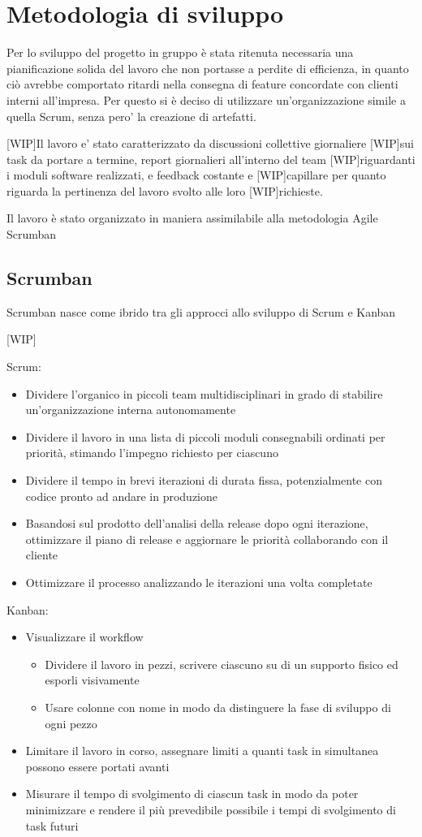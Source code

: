 \chapter{Metodologia di sviluppo}
\label{ch:metodologia}
Per lo sviluppo del progetto in gruppo è stata ritenuta necessaria una pianificazione solida del lavoro che non portasse a perdite di efficienza, in quanto ciò avrebbe comportato ritardi nella consegna di feature concordate con clienti interni all'impresa.
Per questo si è deciso di utilizzare un'organizzazione simile a quella Scrum, senza pero' la creazione di artefatti.

[WIP]Il lavoro e' stato caratterizzato da discussioni collettive giornaliere [WIP]sui task da portare a termine, report giornalieri all'interno del team [WIP]riguardanti i moduli software realizzati, e feedback costante e [WIP]capillare per quanto riguarda la pertinenza del lavoro svolto alle loro [WIP]richieste.

Il lavoro è stato organizzato in maniera assimilabile alla metodologia Agile Scrumban
\section{Scrumban}
Scrumban nasce come ibrido tra gli approcci allo sviluppo di Scrum e Kanban

[WIP]
\begin{multicols}{2}
Scrum:
\begin{itemize}
\item
Dividere l'organico in piccoli team multidisciplinari in grado di stabilire un'organizzazione interna autonomamente
\item
Dividere il lavoro in una lista di piccoli moduli consegnabili ordinati per priorità, stimando l'impegno richiesto per ciascuno
\item
Dividere il tempo in brevi iterazioni di durata fissa, potenzialmente con codice pronto ad andare in produzione
\item
Basandosi sul prodotto dell'analisi della release dopo ogni iterazione, ottimizzare il piano di release e aggiornare le priorità collaborando con il cliente
\item
Ottimizzare il processo analizzando le iterazioni una volta completate
\end{itemize}
\columnbreak
Kanban:
\begin{itemize}
\item
Visualizzare il workflow
\begin{itemize}
\item
Dividere il lavoro in pezzi, scrivere ciascuno su di un supporto fisico ed esporli visivamente
\item
Usare colonne con nome in modo da distinguere la fase di sviluppo di ogni pezzo
\end{itemize}
\item
Limitare il lavoro in corso, assegnare limiti a quanti task in simultanea possono essere portati avanti
\item
Misurare il tempo di svolgimento di ciascun task in modo da poter minimizzare e rendere il più prevedibile possibile i tempi di svolgimento di task futuri
\end{itemize}
\end{multicols}

